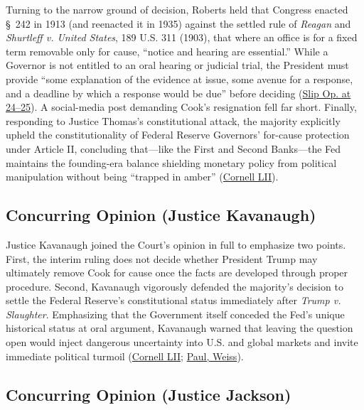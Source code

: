 \documentclass[12pt]{article}
\begin{document}
Turning to the narrow ground of decision, Roberts held that Congress enacted \S~242 in 1913 (and reenacted it in 1935) against the settled rule of \textit{Reagan} and \textit{Shurtleff v. United States}, 189 U.S. 311 (1903), that where an office is for a fixed term removable only for cause, ``notice and hearing are essential.'' While a Governor is not entitled to an oral hearing or judicial trial, the President must provide ``some explanation of the evidence at issue, some avenue for a response, and a deadline by which a response would be due'' before deciding (\href{https://www.supremecourt.gov/opinions/25pdf/25a312_5468.pdf}{Slip Op. at 24--25}). A social-media post demanding Cook's resignation fell far short. Finally, responding to Justice Thomas's constitutional attack, the majority explicitly upheld the constitutionality of Federal Reserve Governors' for-cause protection under Article II, concluding that---like the First and Second Banks---the Fed maintains the founding-era balance shielding monetary policy from political manipulation without being ``trapped in amber'' (\href{https://www.law.cornell.edu/supremecourt/text/25A312}{Cornell LII}).

\subsection{Concurring Opinion (Justice Kavanaugh)}

Justice Kavanaugh joined the Court's opinion in full to emphasize two points. First, the interim ruling does not decide whether President Trump may ultimately remove Cook for cause once the facts are developed through proper procedure. Second, Kavanaugh vigorously defended the majority's decision to settle the Federal Reserve's constitutional status immediately after \textit{Trump v. Slaughter}. Emphasizing that the Government itself conceded the Fed's unique historical status at oral argument, Kavanaugh warned that leaving the question open would inject dangerous uncertainty into U.S. and global markets and invite immediate political turmoil (\href{https://www.law.cornell.edu/supremecourt/text/25A312}{Cornell LII}; \href{https://www.paulweiss.com/insights/client-memos/supreme-court-overrules-humphrey-s-executor-but-preserves-the-fed-s-independence}{Paul, Weiss}).

\subsection{Concurring Opinion (Justice Jackson)}
\end{document}
